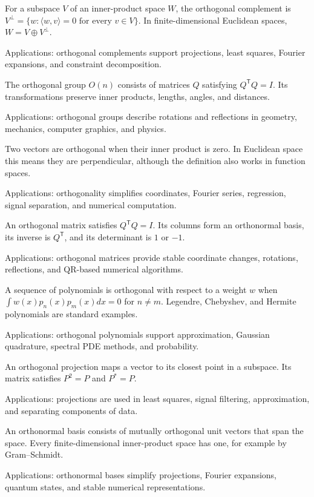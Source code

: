 For a subspace $V$ of an inner-product space $W$, the orthogonal complement is $V^\perp=\{w:\langle w,v\rangle=0\text{ for every }v\in V\}$. In finite-dimensional Euclidean spaces, $W=V\oplus V^\perp$. \par\noindent Applications: orthogonal complements support projections, least squares, Fourier expansions, and constraint decomposition.

The orthogonal group $O(n)$ consists of matrices $Q$ satisfying $Q^{\mathsf T}Q=I$. Its transformations preserve inner products, lengths, angles, and distances. \par\noindent Applications: orthogonal groups describe rotations and reflections in geometry, mechanics, computer graphics, and physics.

Two vectors are orthogonal when their inner product is zero. In Euclidean space this means they are perpendicular, although the definition also works in function spaces. \par\noindent Applications: orthogonality simplifies coordinates, Fourier series, regression, signal separation, and numerical computation.

An orthogonal matrix satisfies $Q^{\mathsf T}Q=I$. Its columns form an orthonormal basis, its inverse is $Q^{\mathsf T}$, and its determinant is $1$ or $-1$. \par\noindent Applications: orthogonal matrices provide stable coordinate changes, rotations, reflections, and QR-based numerical algorithms.

A sequence of polynomials is orthogonal with respect to a weight $w$ when $\int w(x)p_n(x)p_m(x)dx=0$ for $n\ne m$. Legendre, Chebyshev, and Hermite polynomials are standard examples. \par\noindent Applications: orthogonal polynomials support approximation, Gaussian quadrature, spectral PDE methods, and probability.

An orthogonal projection maps a vector to its closest point in a subspace. Its matrix satisfies $P^2=P$ and $P^*=P$. \par\noindent Applications: projections are used in least squares, signal filtering, approximation, and separating components of data.

An orthonormal basis consists of mutually orthogonal unit vectors that span the space. Every finite-dimensional inner-product space has one, for example by Gram--Schmidt. \par\noindent Applications: orthonormal bases simplify projections, Fourier expansions, quantum states, and stable numerical representations.

